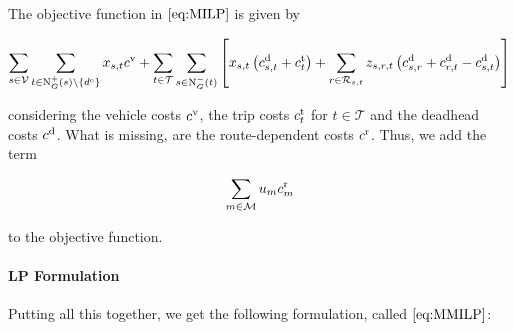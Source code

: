 The objective function in $\eqref{eq:MILP}$ is given by

\begin{align*}
	\sum_{s\in\mathcal{V}} \sum_{t\in\operatorname{N}_G^+(s)\backslash\{d^{\operatorname{e}}\}} x_{s,t}c^{\operatorname{v}}	+ \sum_{t\in\mathcal{T}} \sum_{s\in\operatorname{N}_G^-(t)} \left[x_{s,t}\left(c^{\operatorname{d}}_{s,t}+c^{\operatorname{t}}_{t}\right) + \sum_{r\in\mathcal{R}_{s,t}} z_{s,r,t}\left(c^{\operatorname{d}}_{s,r}+c^{\operatorname{d}}_{r,t}-c^{\operatorname{d}}_{s,t}\right)\right]
\end{align*}

considering the vehicle costs $c^{\operatorname{v}}$, the trip costs $c^{\operatorname{t}}_t$ for $t\in\mathcal{T}$ and the deadhead costs $c^{\operatorname{d}}$. What is missing, are the route-dependent costs $c^{\operatorname{r}}$. Thus, we add the term

\begin{align*}
	\sum_{m\in\mathcal{M}} u_m c^{\operatorname{r}}_m
\end{align*}

to the objective function.

\paragraph{LP Formulation} \parfill

Putting all this together, we get the following formulation, called $\eqref{eq:MMILP}$:

